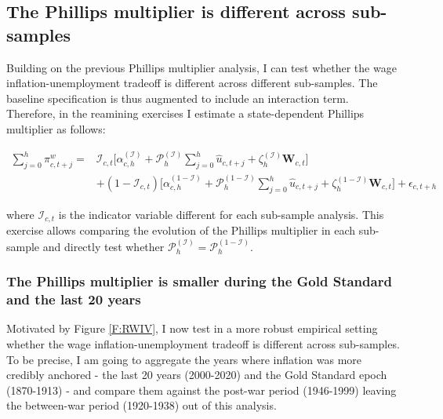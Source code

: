 \documentclass[12pt]{article}
\renewcommand{\vec}[1]{\mathbf{#1}}
\begin{document}


\subsection{The Phillips multiplier is different across sub-samples}

Building on the previous Phillips multiplier analysis, I can test whether the wage inflation-unemployment tradeoff is different across different sub-samples. The baseline specification is thus augmented to include an interaction term. Therefore, in the reamining exercises I estimate a state-dependent Phillips multiplier as follows:

\begin{equation} \label{EQ:MULT_State}
\begin{split}
	\sum_{j=0}^{h} \pi_{c,t+j}^{w} = & \mathcal{I}_{c,t} \Bigg[\alpha_{c,h}^{(\mathcal{I})} + \mathcal{P}^{(\mathcal{I})}_h \sum_{j=0}^{h} \hat{u}_{c,t+j} + \zeta^{(\mathcal{I})}_h \vec{W}_{c,t}\Bigg] \\  
	& + (1 - \mathcal{I}_{c,t}) \Bigg[\alpha_{c,h}^{(1-\mathcal{I})} + \mathcal{P}^{(1-\mathcal{I})}_h \sum_{j=0}^{h} \hat{u}_{c,t+j} + \zeta^{(1-\mathcal{I})}_h \vec{W}_{c,t}\Bigg] +  \epsilon_{c,t+h}
\end{split}
\end{equation}

where $\mathcal{I}_{c,t}$ is the indicator variable different for each sub-sample analysis. This exercise allows comparing the evolution of the Phillips multiplier in each sub-sample and directly test whether $\mathcal{P}_h^{(\mathcal{I})} = \mathcal{P}_h^{(1-\mathcal{I})}$.

\subsubsection{The Phillips multiplier is smaller during the Gold Standard and the last 20 years}

Motivated by Figure \ref{F:RWIV}, I now test in a more robust empirical setting whether the wage inflation-unemployment tradeoff is different across sub-samples. To be precise, I am going to aggregate the years where inflation was more credibly anchored - the last 20 years (2000-2020) and the Gold Standard epoch (1870-1913) - and compare them against the post-war period (1946-1999) leaving the between-war period (1920-1938) out of this analysis.
\end{document}
